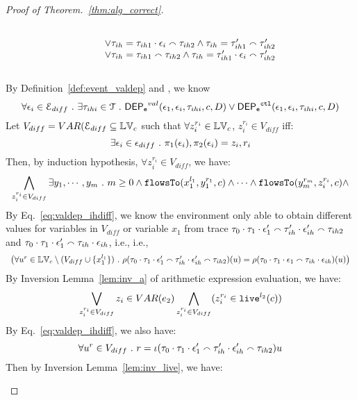 \begin{proof}[Proof of Theorem.~\ref{thm:alg_correct}]
\begin{case}
\begin{subcase}
\begin{equation}
\begin{array}{l}
  \\ \qquad \lor 
  \mathtt{\tau}_{ih} = \mathtt{\tau}_{ih1} \cdot \mathtt{\epsilon}_i \smallfrown \mathtt{\tau}_{ih2} 
  \land 
  \mathtt{\tau}_{ih} = \mathtt{\tau}_{ih1}' \smallfrown \mathtt{\tau}_{ih2}'
  \\ \qquad \lor 
  \mathtt{\tau}_{ih} = \mathtt{\tau}_{ih1} \smallfrown \mathtt{\tau}_{ih2} 
  \land 
  \mathtt{\tau}_{ih} = \mathtt{\tau}_{ih1}' \cdot \mathtt{\epsilon}_i \smallfrown \mathtt{\tau}_{ih2}'
  \end{array}
\end{equation}
%
\\
By Definition~\ref{def:event_valdep} and , we know
\[
  \forall \mathtt{\epsilon}_i \in \mathcal{E}_{diff} ~.~ \exists \mathtt{\tau}_{ihi} \in \mathcal{T} ~.~
  \mathsf{DEP_{\mathtt{e}}}^{val}(\mathtt{\epsilon}_1, \mathtt{\epsilon}_i, \mathtt{\tau}_{ihi}, c, D) 
  \lor \mathsf{DEP_{\mathtt{e}}}^{\mathtt{{ctl}}}(\mathtt{\epsilon}_1, \mathtt{\epsilon}_i, \mathtt{\tau}_{ihi}, c, D)
\]
Let $V_{diff} = VAR(\mathcal{E}_{diff} \subseteq \mathbb{LV}_c$ such that $\forall z_i^{r_i} \in \mathbb{LV}_c$, $z_i^{r_i} \in V_{diff}$ iff:
\[
  \exists \mathtt{\epsilon}_i \in \mathtt{\epsilon}_{diff} ~.~ \pi_1(\mathtt{\epsilon}_i), \pi_2(\mathtt{\epsilon}_i) = z_i, r_i
\]
Then, by induction hypothesis, $\forall z_i^{r_i} \in V_{diff}$, we have:
\[
  \bigwedge_{z_i^{r_i} \in V_{diff}}
  \exists y_1, \cdots, y_m ~.~ 
  m \geq 0 \land
  \mathtt{flowsTo}(x_1^{l_1}, y_1^{r_1}, c) \land \cdots \land \mathtt{flowsTo}(y_m^{r_m}, z_i^{r_i}, c) \land 
\]
%
%
By Eq.~\ref{eq:valdep_ihdiff}, we know 
the environment only able to obtain different values for variables in $V_{diff}$ or variable $x_1$
from trace $\mathtt{\tau}_0 \cdot \mathtt{\tau}_1 \cdot \mathtt{\epsilon}_1' \smallfrown \mathtt{\tau}_{ih}' \cdot \mathtt{\epsilon}_{ih}' \smallfrown \mathtt{\tau}_{ih2}$ 
and 
$\mathtt{\tau}_0 \cdot \mathtt{\tau}_1 \cdot \mathtt{\epsilon}_1' \smallfrown \mathtt{\tau}_{ih} \cdot \mathtt{\epsilon}_{ih}$, i.e.,
 i.e., 
\[
\begin{array}{l}
  \big(\forall u^r \in \mathbb{LV}_c \setminus (V_{diff} \cup \{x_1^{l_1}\}) ~.~
    \rho(\mathtt{\tau}_0 \cdot \mathtt{\tau}_1 \cdot \mathtt{\epsilon}_1' \smallfrown \mathtt{\tau}_{ih}' \cdot \mathtt{\epsilon}_{ih}' \smallfrown \mathtt{\tau}_{ih2}) (u) =  
    \rho(\mathtt{\tau}_0 \cdot \mathtt{\tau}_1 \cdot \mathtt{\epsilon}_1 \smallfrown \mathtt{\tau}_{ih} \cdot \mathtt{\epsilon}_{ih}) (u)
    \big)
  \end{array}
\]
%
%
By {Inversion Lemma~\ref{lem:inv_a}} of arithmetic expression evaluation, we have: 
%
\[
  \bigvee_{z_i^{r_i} \in V_{diff}} z_i \in VAR(e_2)
  \bigwedge_{z_i^{r_i} \in V_{diff}} (z_i^{r_i} \in \mathtt{live}^{l_2}(c))
\]
%
By Eq.~\ref{eq:valdep_ihdiff}, we also have:
\[
   \forall u^r \in V_{diff} ~.~ r = \iota(\mathtt{\tau}_0 \cdot \mathtt{\tau}_1 \cdot \mathtt{\epsilon}_1' \smallfrown \mathtt{\tau}_{ih}' \cdot \mathtt{\epsilon}_{ih}' \smallfrown \mathtt{\tau}_{ih2}) u
\]
%
Then by Inversion Lemma~\ref{lem:inv_live}, we have:

\end{subcase}
\end{case}
\end{proof}

